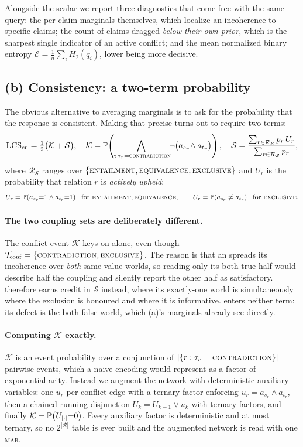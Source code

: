 Alongside the scalar we report three diagnostics that come free with the same query: the per-claim
marginals themselves, which localize an incoherence to specific claims; the count of claims dragged
\emph{below their own prior}, which is the sharpest single indicator of an active conflict; and the
mean normalized binary entropy $\mathcal{E}=\tfrac1n\sum_i H_2(q_i)$, lower being more decisive.

\subsection{(b) Consistency: a two-term probability}
\label{sec-consistency}

The obvious alternative to averaging marginals is to ask for the probability that the response is
consistent. Making that precise turns out to require two terms:
\begin{equation}
\mathrm{LCS}_{\mathrm{cn}} = \tfrac12\bigl(\mathcal{K}+\mathcal{S}\bigr),\quad
\mathcal{K} = \mathbb{P}\!\left( \!\!\bigwedge_{r:\,\tau_r=\textsc{contradiction}}\!\!\neg\bigl(a_{s_r}\!\wedge a_{t_r}\bigr) \right),\quad
\mathcal{S} = \frac{\sum_{r\in\mathcal{R}_{\mathcal{S}}} p_r\,U_r}
                   {\sum_{r\in\mathcal{R}_{\mathcal{S}}} p_r},
\label{eq-cons}
\end{equation}
where $\mathcal{R}_{\mathcal{S}}$ ranges over $\{\textsc{entailment},\textsc{equivalence},\textsc{exclusive}\}$ and $U_r$ is the probability that
relation $r$ is \emph{actively upheld}:
\[
U_r=\mathbb{P}\!\left( a_{s_r}{=}1 \wedge a_{t_r}{=}1 \right)\ \text{ for }\textsc{entailment},\textsc{equivalence},
\qquad
U_r=\mathbb{P}\!\left( a_{s_r}\neq a_{t_r} \right)\ \text{ for }\textsc{exclusive} .
\]

\paragraph{The two coupling sets are deliberately different.} The conflict event $\mathcal{K}$ keys
on \con{} alone, even though $\mathcal{T}_{\mathrm{conf}}=\{\textsc{contradiction},\textsc{exclusive}\}$. The reason is that an
\exc{} spreads its incoherence over \emph{both} same-value worlds, so reading only its both-true half
would describe half the coupling and silently report the other half as satisfactory. \exc{} therefore
earns credit in $\mathcal{S}$ instead, where its exactly-one world is simultaneously where the
exclusion is honoured and where it is informative. \cnc{} enters neither term: its defect is the
both-false world, which (a)'s marginals already see directly.

\paragraph{Computing $\mathcal{K}$ exactly.} $\mathcal{K}$ is an event probability over a conjunction
of $|\{r:\tau_r=\textsc{contradiction}\}|$ pairwise events, which a naive encoding would represent as a factor of
exponential arity. Instead we augment the network with deterministic auxiliary variables: one
$u_r$ per conflict edge with a ternary factor enforcing $u_r = a_{s_r}\wedge a_{t_r}$, then a chained
running disjunction $U_k = U_{k-1}\vee u_k$ with ternary factors, and finally
$\mathcal{K}=\mathbb{P}\!\left( U_{|\cdot|}{=}0 \right)$. Every auxiliary factor is deterministic and at most ternary, so
no $2^{|\mathcal{R}|}$ table is ever built and the augmented network is read with one \textsc{mar}.

